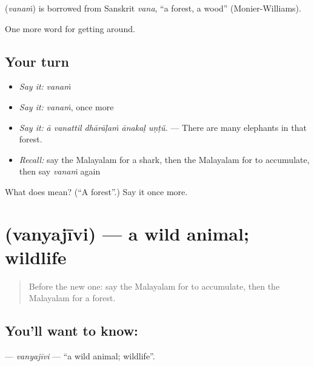 \begin{cousinweb}
\textbf{} (\emph{vanaṁ}) is borrowed from Sanskrit \emph{vana}, \textquotedblleft{}a forest, a wood\textquotedblright{} (Monier-Williams).
\end{cousinweb}

\begin{grammarlens}[title={What you've built}]
One more word for getting around.
\end{grammarlens}

\subsection*{Your turn}
\begin{itemize}
\raggedright
  \item \emph{Say it:} \emph{vanaṁ}
  \item \emph{Say it:} \emph{vanaṁ}, once more
  \item \emph{Say it:} \emph{ā vanattil dhārāḷaṁ ānakaḷ uṇṭŭ.} — There are many elephants in that forest.
  \item \emph{Recall:} say the Malayalam for a shark, then the Malayalam for to accumulate, then say \emph{vanaṁ} again
\end{itemize}

\begin{tcolorbox}[breakable,colback=teal!4,colframe=teal!35!black,title={Before you move on}]
What does  mean? (\textquotedblleft{}A forest\textquotedblright{}.) Say it once more.
\end{tcolorbox}
\section[\texorpdfstring{\ml{വന്യജീവി} (vanyajīvi)}{വന്യജീവി (vanyajīvi)}]{ (vanyajīvi) — a wild animal; wildlife}

\label{lesson:ML-C499-vanyajivi}



\begin{quote}
Before the new one: say the Malayalam for to accumulate, then the Malayalam for a forest.
\end{quote}

\subsection*{You'll want to know: }
\textbf{} — \emph{vanyajīvi} — \textquotedblleft{}a wild animal; wildlife\textquotedblright{}.

